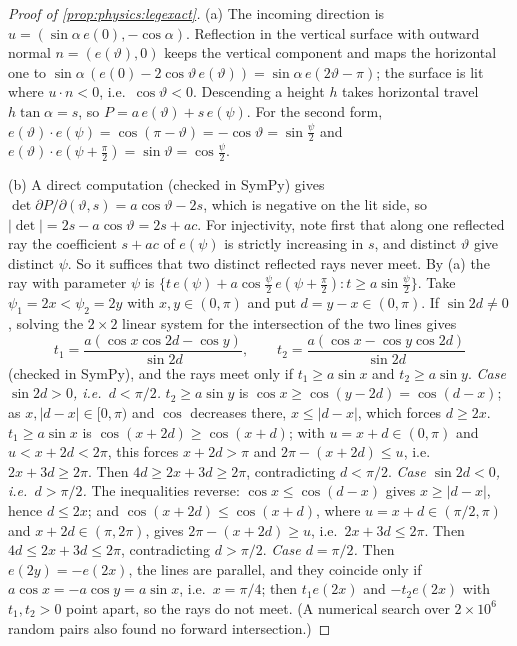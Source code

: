 \begin{proof}[Proof of \cref{prop:physics:legexact}]
(a) The incoming direction is $u=(\sin\alpha\,e(0),-\cos\alpha)$. Reflection in the vertical
surface with outward normal $n=(e(\vartheta),0)$ keeps the vertical component and maps the
horizontal one to $\sin\alpha\,(e(0)-2\cos\vartheta\,e(\vartheta))=\sin\alpha\,e(2\vartheta-\pi)$;
the surface is lit where $u\cdot n<0$, i.e.\ $\cos\vartheta<0$. Descending a height $h$ takes
horizontal travel $h\tan\alpha=s$, so $P=a\,e(\vartheta)+s\,e(\psi)$. For the second form,
$e(\vartheta)\cdot e(\psi)=\cos(\pi-\vartheta)=-\cos\vartheta=\sin\frac\psi2$ and
$e(\vartheta)\cdot e(\psi+\frac\pi2)=\sin\vartheta=\cos\frac\psi2$.

(b) A direct computation (checked in SymPy) gives
$\det\partial P/\partial(\vartheta,s)=a\cos\vartheta-2s$, which is negative on the lit side, so
$|\det|=2s-a\cos\vartheta=2s+ac$. For injectivity, note first that along one reflected ray
the coefficient $s+ac$ of $e(\psi)$ is strictly increasing in $s$, and distinct $\vartheta$
give distinct $\psi$. So it suffices that two distinct reflected rays never meet. By (a) the
ray with parameter $\psi$ is $\{t\,e(\psi)+a\cos\frac\psi2\,e(\psi+\frac\pi2):t\ge a\sin\frac\psi2\}$.
Take $\psi_1=2x<\psi_2=2y$ with $x,y\in(0,\pi)$ and put $d=y-x\in(0,\pi)$. If $\sin2d\neq0$,
solving the $2\times2$ linear system for the intersection of the two lines gives
\[
t_1=\frac{a(\cos x\cos2d-\cos y)}{\sin2d},\qquad t_2=\frac{a(\cos x-\cos y\cos2d)}{\sin2d}
\]
(checked in SymPy), and the rays meet only if $t_1\ge a\sin x$ and $t_2\ge a\sin y$.
\emph{Case $\sin2d>0$, i.e.\ $d<\pi/2$.} $t_2\ge a\sin y$ is $\cos x\ge\cos(y-2d)=\cos(d-x)$;
as $x,|d-x|\in[0,\pi)$ and $\cos$ decreases there, $x\le|d-x|$, which forces $d\ge2x$.
$t_1\ge a\sin x$ is $\cos(x+2d)\ge\cos(x+d)$; with $u=x+d\in(0,\pi)$ and $u<x+2d<2\pi$, this
forces $x+2d>\pi$ and $2\pi-(x+2d)\le u$, i.e.\ $2x+3d\ge2\pi$. Then $4d\ge2x+3d\ge2\pi$,
contradicting $d<\pi/2$. \emph{Case $\sin2d<0$, i.e.\ $d>\pi/2$.} The inequalities reverse:
$\cos x\le\cos(d-x)$ gives $x\ge|d-x|$, hence $d\le2x$; and $\cos(x+2d)\le\cos(x+d)$, where
$u=x+d\in(\pi/2,\pi)$ and $x+2d\in(\pi,2\pi)$, gives $2\pi-(x+2d)\ge u$, i.e.\ $2x+3d\le2\pi$.
Then $4d\le2x+3d\le2\pi$, contradicting $d>\pi/2$. \emph{Case $d=\pi/2$.} Then
$e(2y)=-e(2x)$, the lines are parallel, and they coincide only if $a\cos x=-a\cos y=a\sin x$,
i.e.\ $x=\pi/4$; then $t_1e(2x)$ and $-t_2e(2x)$ with $t_1,t_2>0$ point apart, so the rays
do not meet. (A numerical search over $2\times10^6$ random pairs also found no forward
intersection.)


\end{proof}
